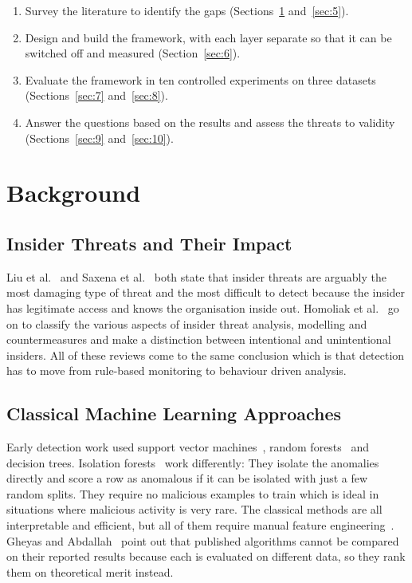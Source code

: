 \documentclass[a4paper,12pt]{article}
\begin{document}
\begin{enumerate}
  \item Survey the literature to identify the gaps (Sections~\ref{sec:4} and~\ref{sec:5}).
  \item Design and build the framework, with each layer separate so that it can be switched off and measured (Section~\ref{sec:6}).
  \item Evaluate the framework in ten controlled experiments on three datasets (Sections~\ref{sec:7} and~\ref{sec:8}).
  \item Answer the questions based on the results and assess the threats to validity (Sections~\ref{sec:9} and~\ref{sec:10}).
\end{enumerate}
\section{Background}
\label{sec:4}

\subsection{Insider Threats and Their Impact}
\label{sec:4.1}

Liu et al.~\cite{liu2018} and Saxena et al.~\cite{saxena2020} both state that insider threats are arguably the most damaging type of threat and the most difficult to detect because the insider has legitimate access and knows the organisation inside out. Homoliak et al.~\cite{homoliak2019} go on to classify the various aspects of insider threat analysis, modelling and countermeasures and make a distinction between intentional and unintentional insiders. All of these reviews come to the same conclusion which is that detection has to move from rule-based monitoring to behaviour driven analysis.

\subsection{Classical Machine Learning Approaches}
\label{sec:4.2}

Early detection work used support vector machines~\cite{cortes1995}, random forests~\cite{breiman2001} and decision trees. Isolation forests~\cite{liu2008} work differently: They isolate the anomalies directly and score a row as anomalous if it can be isolated with just a few random splits. They require no malicious examples to train which is ideal in situations where malicious activity is very rare. The classical methods are all interpretable and efficient, but all of them require manual feature engineering~\cite{alzaabi2024}. Gheyas and Abdallah~\cite{gheyas2016} point out that published algorithms cannot be compared on their reported results because each is evaluated on different data, so they rank them on theoretical merit instead.
\end{document}
